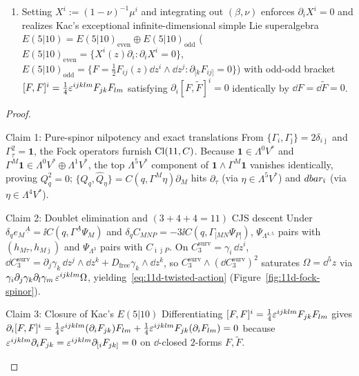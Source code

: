 \begin{theorem}
\begin{enumerate}[label=(\arabic*),leftmargin=*]
\begin{equation}
  \end{equation}
  \item Setting $X^i := (1-\nu)^{-1}\mu^i$ and integrating out $(\beta,\nu)$ enforces $\partial_i X^i = 0$ and realizes Kac's exceptional infinite-dimensional simple Lie superalgebra $E(5|10) = E(5|10)_{\mathrm{even}}\oplus E(5|10)_{\mathrm{odd}}$ ($E(5|10)_{\mathrm{even}} = \{X^i(z)\partial_i : \partial_i X^i = 0\}$, $E(5|10)_{\mathrm{odd}} = \{F = \frac{1}{2}F_{ij}(z)\dd z^i\wedge\dd z^j : \partial_{[k}F_{ij]} = 0\}$) with odd-odd bracket $[F,F]^i = \frac{1}{4}\varepsilon^{ijklm}F_{jk}F_{lm}$ satisfying $\partial_i[F,\widetilde{F}]^i = 0$ identically by $\dd F = \dd\widetilde{F} = 0$.
\end{enumerate}
\end{theorem}

\begin{proof}\leavevmode
\begin{proofpart}{Claim 1: Pure-spinor nilpotency and exact translations}
From $\{\Gamma_i,\Gamma_{\bar{\jmath}}\} = 2\delta_{i\bar{\jmath}}$ and $\Gamma_\tau^2 = \mathbf{1}$, the Fock operators furnish $\mathrm{Cl}(11,C)$. Because $\mathbf{1} \in \Lambda^0 V^*$ and $\Gamma^M\mathbf{1} \in \Lambda^0 V^*\oplus\Lambda^1 V^*$, the top $\Lambda^5 V^*$ component of $\mathbf{1}\wedge\Gamma^M\mathbf{1}$ vanishes identically, proving $Q_q^2 = 0$; $\{Q_q, \widehat{Q}_\eta\} = C(q,\Gamma^M\eta)\partial_M$ hits $\partial_\tau$ (via $\eta \in \Lambda^5 V^*$) and $dbar_{\bar{\imath}}$ (via $\eta \in \Lambda^4 V^*$).
\end{proofpart}
\begin{proofpart}{Claim 2: Doublet elimination and $(3+4+4=11)$ CJS descent}
Under $\delta_q e_M{}^{\underline{A}} = \ii C(q,\Gamma^{\underline{A}}\Psi_M)$ and $\delta_q C_{MNP} = -3\ii C(q,\Gamma_{[MN}\Psi_{P]})$, $\Psi_{\Lambda^{4,5}}$ pairs with $(h_{M\tau}, h_{M\bar{\jmath}})$ and $\Psi_{\Lambda^3}$ pairs with $C_{\bar{\imath}\bar{\jmath}P}$. On $C_3^{\mathrm{surv}} = \gamma_i\,\dd z^i$, $\dd C_3^{\mathrm{surv}} = \partial_j\gamma_k\,\dd z^j\wedge\dd z^k + D_{\mathrm{free}}\gamma_k\wedge\dd z^k$, so $C_3^{\mathrm{surv}}\wedge(\dd C_3^{\mathrm{surv}})^2$ saturates $\Omega = \dd^5 z$ via $\gamma_i\partial_j\gamma_k\partial_l\gamma_m\,\varepsilon^{ijklm}\Omega$, yielding~\eqref{eq:11d-twisted-action} (Figure~\ref{fig:11d-fock-spinor}).
\end{proofpart}
\begin{proofpart}{Claim 3: Closure of Kac's $E(5|10)$}
Differentiating $[F,F]^i = \frac{1}{4}\varepsilon^{ijklm}F_{jk}F_{lm}$ gives $\partial_i[F,F]^i = \frac{1}{4}\varepsilon^{ijklm}(\partial_i F_{jk})F_{lm} + \frac{1}{4}\varepsilon^{ijklm}F_{jk}(\partial_iF_{lm}) = 0$ because $\varepsilon^{ijklm}\partial_i F_{jk} = \varepsilon^{ijklm}\partial_{[i}F_{jk]} = 0$ on $\dd$-closed $2$-forms $F, \widetilde{F}$.
\end{proofpart}
\end{proof}

